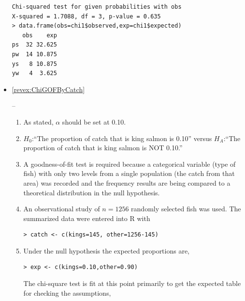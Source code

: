 \documentclass[10pt,openany]{book}\usepackage[]{graphicx}\usepackage[]{color}
\makeatletter
\newenvironment{kframe}{%
 \def\at@end@of@kframe{}%
 \ifinner\ifhmode%
  \def\at@end@of@kframe{\end{minipage}}%
  \begin{minipage}{\columnwidth}%
 \fi\fi%
 \def\FrameCommand##1{\hskip\@totalleftmargin \hskip-\fboxsep
 \colorbox{shadecolor}{##1}\hskip-\fboxsep
     \hskip-\linewidth \hskip-\@totalleftmargin \hskip\columnwidth}%
 \MakeFramed {\advance\hsize-\width
   \@totalleftmargin\z@ \linewidth\hsize
   \@setminipage}}%
 {\par\unskip\endMakeFramed%
 \at@end@of@kframe}
\newenvironment{knitrout}{}{} %
\makeatother
\begin{document}
\begin{itemize}
\begin{knitrout}
\begin{kframe}
{\ttfamily\noindent\color{warningcolor}{Warning in chisq.test(obs, p = p.exp, rescale.p = TRUE, correct = FALSE): Chi-squared approximation may be incorrect}}\begin{verbatim}
Chi-squared test for given probabilities with obs 
X-squared = 1.7088, df = 3, p-value = 0.635
> data.frame(obs=chi1$observed,exp=chi1$expected)
   obs    exp
ps  32 32.625
pw  14 10.875
ys   8 10.875
yw   4  3.625
\end{verbatim}
\end{kframe}
\end{knitrout}
  \item \hypertarget{ans:ChiGOFByCatch}{\ref{revex:ChiGOFByCatch}} --
    \begin{enumerate}
      \item As stated, $\alpha$ should be set at 0.10.
      \item $H_{0}$:``The proportion of catch that is king salmon is 0.10'' versus $H_{A}$:``The proportion of catch that is king salmon is NOT 0.10.''
      \item A goodness-of-fit test is required because a categorical variable (type of fish) with only two levels from a single population (the catch from that area) was recorded and the frequency results are being compared to a theoretical distribution in the null hypothesis.
      \item An observational study of $n=1256$ randomly selected fish was used.  The summarized data were entered into R with
\begin{knitrout}
\color{fgcolor}\begin{kframe}
\begin{verbatim}
> catch <- c(kings=145, other=1256-145)
\end{verbatim}
\end{kframe}
\end{knitrout}
      \item Under the null hypothesis the expected proportions are,
\begin{knitrout}
\color{fgcolor}\begin{kframe}
\begin{verbatim}
> exp <- c(kings=0.10,other=0.90)
\end{verbatim}
\end{kframe}
\end{knitrout}
The chi-square test is fit at this point primarily to get the expected table for checking the assumptions,

\end{enumerate}
\end{itemize}
\end{document}
